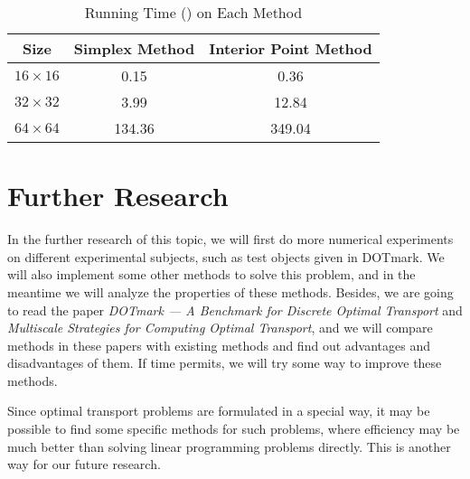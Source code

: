 \documentclass[english]{PKUPaper}
\begin{document}
\begin{table}[h]
\caption{Running Time (\Si{\second}) on Each Method} \label{Tbl:RunningTime}
\centering
\begin{tabular}{|c|c|c|}
	\hline
Size	& Simplex Method & Interior Point Method\\
	\hline
	$16\times 16$ & 0.15 & 0.36\\
	\hline
	$32\times 32$ & 3.99 & 12.84 \\
	\hline
	$64\times 64$ & 134.36 & 349.04 \\
	\hline
\end{tabular}
\end{table}

\section{Further Research}

In the further research of this topic, we will first do more numerical experiments on different experimental subjects, such as test objects given in DOTmark. We will also implement some other methods  to solve this problem, and in the meantime we will analyze the properties of these methods. Besides, we are going to read the paper \emph{DOTmark — A Benchmark for Discrete Optimal Transport} and \emph{Multiscale Strategies for Computing Optimal Transport}, and we will compare methods in these papers with existing methods and find out advantages and disadvantages of them. If time permits, we will try some way to improve these methods.

Since optimal transport problems are formulated in a special way, it may be possible to find some specific methods for such problems, where efficiency may be much better than solving linear programming problems directly. This is another way for our future research.
\end{document}
